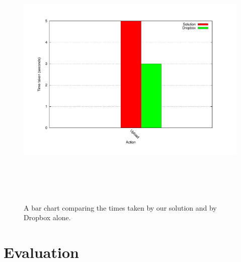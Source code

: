 \documentclass[12pt, titlepage]{article}
\begin{document}
\begin{figure}[!t]
\centerline{\includegraphics[height=5.0in,width=7in,angle=0]{plots/solutionvdropbox/solutionvdropbox.pdf}}
\caption{A bar chart comparing the times taken by our solution and by Dropbox alone.}
\label{fig:loginLineGraph}
\end{figure}


\section{Evaluation}
\end{document}
